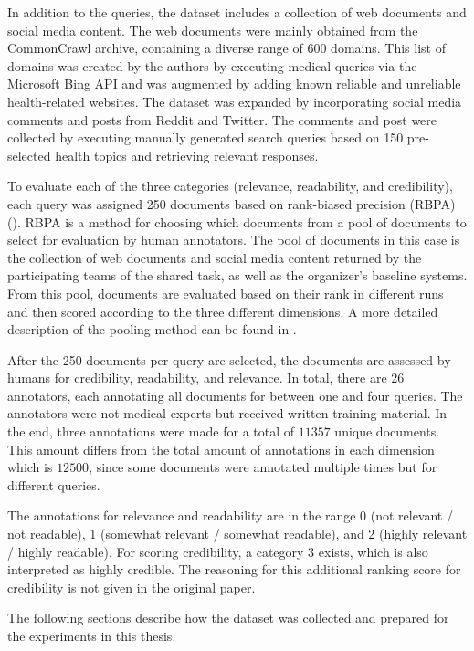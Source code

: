 In addition to the queries, the dataset includes a collection of web documents and social media content.
The web documents were mainly obtained from the CommonCrawl archive, containing a diverse range of 600 domains.
This list of domains was created by the authors by executing medical queries via the Microsoft Bing API and was augmented by adding known reliable and unreliable health-related websites.
The dataset was expanded by incorporating social media comments and posts from Reddit and Twitter.
The comments and post were collected by executing manually generated search queries based on 150 pre-selected health topics and retrieving relevant responses.

To evaluate each of the three categories (relevance, readability, and credibility), each query was assigned 250 documents based on rank-biased precision (RBPA) (\cite{moffat:2008:Rank}).
RBPA is a method for choosing which documents from a pool of documents to select for evaluation by human annotators.
The pool of documents in this case is the collection of web documents and social media content returned by the participating teams of the shared task, as well as the organizer's baseline systems.
From this pool, documents are evaluated based on their rank in different runs and then scored according to the three different dimensions.
A more detailed description of the pooling method can be found in \cite{lipani:2017:Fixed}.

After the 250 documents per query are selected, the documents are assessed by humans for credibility, readability, and relevance.
In total, there are 26 annotators, each annotating all documents for between one and four queries.
The annotators were not medical experts but received written training material.
In the end, three annotations were made for a total of $11 357$ unique documents.
This amount differs from the total amount of annotations in each dimension which is $12 500$, since some documents were annotated multiple times but for different queries.

The annotations for relevance and readability are in the range 0 (not relevant / not readable), 1 (somewhat relevant / somewhat readable), and 2 (highly relevant / highly readable).
For scoring credibility, a category 3 exists, which is also interpreted as highly credible.
The reasoning for this additional ranking score for credibility is not given in the original paper.

The following sections describe how the dataset was collected and prepared for the experiments in this thesis.
